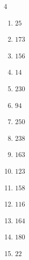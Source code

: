 \begin{multicols}{4}
\begin{enumerate}

  \item $25$


  \item $173$


  \item $156$


  \item $14$


  \item $230$


  \item $94$


  \item $250$


  \item $238$


  \item $163$


  \item $123$


  \item $158$


  \item $116$


\columnbreak %

  \item $164$


  \item $180$


  \item $22$



\end{enumerate}
\end{multicols}

